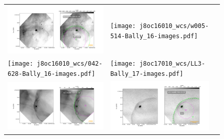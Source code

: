 \documentclass{article}
\begin{document}
\begin{figure}[htp]
\begin{tabular}{l l l}
    \includegraphics[width=0.5\linewidth, trim=60 50 100 50]{j8oc14010_wcs/203-3039-Bally_14-images.pdf}
    &\texttt{[image: j8oc16010\_wcs/w005-514-Bally\_16-images.pdf]}\\ 
    \texttt{[image: j8oc16010\_wcs/042-628-Bally\_16-images.pdf]} 
    &\texttt{[image: j8oc17010\_wcs/LL3-Bally\_17-images.pdf]}\\ 
    \includegraphics[width=0.5\linewidth, trim=60 50 100 50]{j8oc18010_wcs/LL2-Bally_18-images.pdf}
    &\includegraphics[width=0.5\linewidth, trim=60 50 100 50]{j8oc24010_wcs/LL4-Bally_24-images.pdf}\\
    
\end{tabular}
\end{figure}
\end{document}
